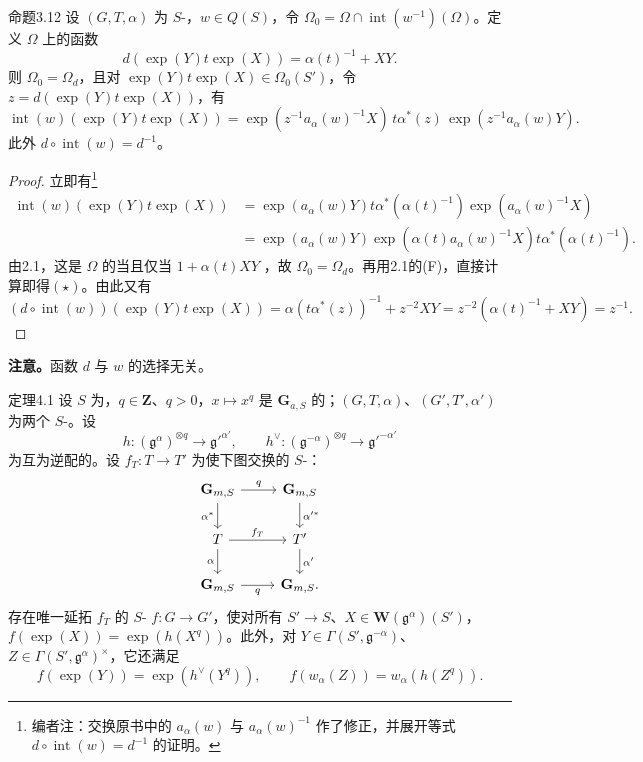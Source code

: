 \begin{SGAresult}{命题}{3.12}
设 $(G,T,\alpha)$ 为 $S$-，$w\in Q(S)$，令 $\Omega_0=\Omega\cap\operatorname{int}(w^{-1})(\Omega)$。定义 $\Omega$ 上的函数
\[d(\exp(Y)t\exp(X))=\alpha(t)^{-1}+XY.\]
则 $\Omega_0=\Omega_d$，且对 $\exp(Y)t\exp(X)\in\Omega_0(S')$，令 $z=d(\exp(Y)t\exp(X))$，有
\[\operatorname{int}(w)(\exp(Y)t\exp(X))=\exp(z^{-1}a_\alpha(w)^{-1}X)\,t\alpha^*(z)\,\exp(z^{-1}a_\alpha(w)Y).\tag{$\star$}\]
此外 $d\circ\operatorname{int}(w)=d^{-1}$。
\end{SGAresult}
\begin{proof}
立即有\footnote{编者注：交换原书中的 $a_\alpha(w)$ 与 $a_\alpha(w)^{-1}$ 作了修正，并展开等式 $d\circ\operatorname{int}(w)=d^{-1}$ 的证明。}
\[\begin{aligned}\operatorname{int}(w)(\exp(Y)t\exp(X))&=\exp(a_\alpha(w)Y)t\alpha^*(\alpha(t)^{-1})\exp(a_\alpha(w)^{-1}X)\\&=\exp(a_\alpha(w)Y)\exp(\alpha(t)a_\alpha(w)^{-1}X)t\alpha^*(\alpha(t)^{-1}).\end{aligned}\]
由2.1，这是 $\Omega$ 的当且仅当 $1+\alpha(t)XY$ ，故 $\Omega_0=\Omega_d$。再用2.1的(F)，直接计算即得$(\star)$。由此又有
\[(d\circ\operatorname{int}(w))(\exp(Y)t\exp(X))=\alpha(t\alpha^*(z))^{-1}+z^{-2}XY=z^{-2}(\alpha(t)^{-1}+XY)=z^{-1}.\]
\end{proof}
\textbf{注意。}函数 $d$ 与 $w$ 的选择无关。
\begin{SGAresult}{定理}{4.1}
设 $S$ 为，$q\in\mathbf Z$、$q>0$，$x\mapsto x^q$ 是 $\mathbf G_{a,S}$ 的；$(G,T,\alpha)$、$(G',T',\alpha')$ 为两个 $S$-。设
\[h:(\mathfrak g^\alpha)^{\otimes q}\to\mathfrak g'^{\alpha'},\qquad h^\vee:(\mathfrak g^{-\alpha})^{\otimes q}\to\mathfrak g'^{-\alpha'}\]
为互为逆配的。设 $f_T:T\to T'$ 为使下图交换的 $S$-：
\[\begin{tikzcd}\mathbf G_{m,S}\arrow[r,"q"]\arrow[d,"\alpha^*"']&\mathbf G_{m,S}\arrow[d,"\alpha'^*"]\\T\arrow[r,"f_T"]\arrow[d,"\alpha"']&T'\arrow[d,"\alpha'"]\\\mathbf G_{m,S}\arrow[r,"q"']&\mathbf G_{m,S}.\end{tikzcd}\]
存在唯一延拓 $f_T$ 的 $S$- $f:G\to G'$，使对所有 $S'\to S$、$X\in\mathbf W(\mathfrak g^\alpha)(S')$，$f(\exp(X))=\exp(h(X^q))$。此外，对 $Y\in\Gamma(S',\mathfrak g^{-\alpha})$、$Z\in\Gamma(S',\mathfrak g^\alpha)^\times$，它还满足
\[f(\exp(Y))=\exp(h^\vee(Y^q)),\qquad f(w_\alpha(Z))=w_\alpha(h(Z^q)).\]
\end{SGAresult}
